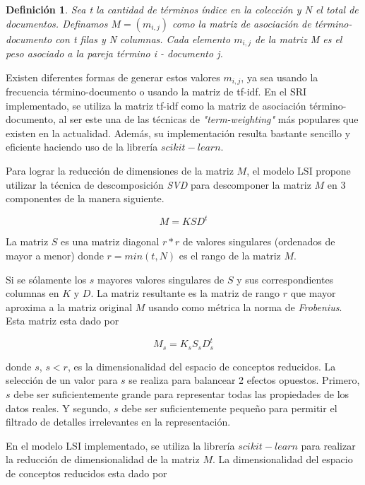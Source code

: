 \documentclass[a4paper, 10pt]{article}
\newtheorem{definition}{Definici\'on}
\begin{document}
	\begin{definition}
		Sea t la cantidad de t\'erminos \'indice en la colecci\'on y N el total de documentos. Definamos $M=(m_{i,j})$ como la matriz de asociaci\'on de t\'ermino-documento con t filas y N columnas. Cada elemento $m_{i, j}$ de la matriz M es el peso asociado a la pareja t\'ermino i - documento j. 
	\end{definition}
	
	Existen diferentes formas de generar estos valores $m_{i,j}$, ya sea usando la frecuencia t\'ermino-documento o usando la matriz de tf-idf. En el SRI implementado, se utiliza la matriz tf-idf como la matriz de asociaci\'on t\'ermino-documento, al ser este una de las t\'ecnicas de \textit{"term-weighting"} m\'as populares que existen en la actualidad. Adem\'as, su implementaci\'on resulta bastante sencillo y eficiente haciendo uso de la librer\'ia $scikit-learn$.
	
	Para lograr la reducci\'on de dimensiones de la matriz $M$, el modelo LSI propone utilizar la t\'ecnica de descomposici\'on \textit{SVD} para descomponer la matriz $M$ en 3 componentes de la manera siguiente.

	\begin{equation}
		M = KSD^t
	\end{equation}
	
	La matriz $S$ es una matriz diagonal $r*r$ de valores singulares (ordenados de mayor a menor) donde $r = min(t, N)$ es el rango de la matriz $M$.
	
	Si se s\'olamente los $s$ mayores valores singulares de $S$ y sus correspondientes columnas en $K$ y $D$. La matriz resultante es la matriz de rango $r$ que mayor aproxima a la matriz original $M$ usando como m\'etrica la norma de \textit{Frobenius}. Esta matriz esta dado por
	
	\begin{equation}		
		M_s = K_sS_sD^t_s
	\end{equation}

	donde $s$, $s < r$, es la dimensionalidad del espacio de conceptos reducidos. La selecci\'on de un valor para $s$ se realiza para balancear 2 efectos opuestos. Primero, $s$ debe ser suficientemente grande para representar todas las propiedades de los datos reales. Y segundo, $s$ debe ser suficientemente peque\~no para permitir el filtrado de detalles irrelevantes en la representaci\'on.

	En el modelo LSI implementado, se utiliza la librer\'ia $scikit-learn$ para realizar la reducci\'on de dimensionalidad de la matriz $M$. La dimensionalidad del espacio de conceptos reducidos esta dado por
\end{document}
